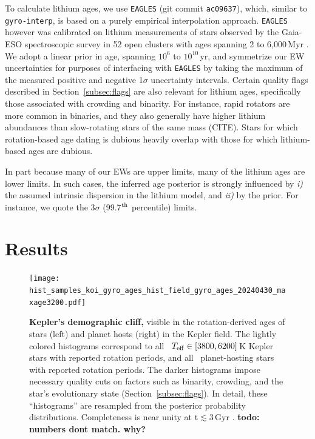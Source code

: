 \documentclass[11pt,twocolumn,tighten]{aastex63}
\begin{document}
To calculate lithium ages, we use \texttt{EAGLES} (git commit
\texttt{ac09637}), which, similar to
\texttt{gyro-interp}, is based on a purely empirical interpolation
approach.  \texttt{EAGLES} however was calibrated on lithium measurements of
stars observed by the
Gaia-ESO spectroscopic survey in 52 open clusters with ages spanning 2
to 6{,}000\,Myr \citep{Jeffries_2023}.  We adopt a linear prior in
age, spanning $10^6$ to $10^{10}$\,yr, and symmetrize our EW
uncertainties for purposes of interfacing with \texttt{EAGLES} by
taking the maximum of the measured positive and negative 1$\sigma$
uncertainty intervals.
Certain quality flags described in Section~\ref{subsec:flags} are also
relevant for lithium ages, specifically those associated with
crowding and binarity.
For instance, rapid rotators are more common in binaries, and they also
generally have higher lithium abundances than slow-rotating stars of the
same mass (CITE).
Stars for which rotation-based age dating is dubious heavily overlap
with those for which lithium-based ages are dubious.

In part because many of our EWs are upper limits, 
many of the lithium ages are lower limits.
In such cases,  the inferred age posterior is strongly influenced by
{\it i)} the assumed intrinsic dispersion in the lithium model,
and {\it ii)} by the prior.
For instance, 
 we quote the 3$\sigma$ (99.7$^{\rm th}$ percentile) limits.


\section{Results}
\label{sec:results}

\begin{figure}[!t]
  \begin{center}
    \leavevmode
    \texttt{[image: hist\_samples\_koi\_gyro\_ages\_hist\_field\_gyro\_ages\_20240430\_maxage3200.pdf]}
  \end{center}
  \vspace{-0.6cm}
  \caption{
    {\bf Kepler's demographic cliff,} visible in the rotation-derived
    ages of stars (left) and planet hosts (right) in the Kepler field.
    The lightly colored histograms correspond to all
    \nuniqstarsantosrotteffcut\ $T_{\rm eff}\in[3800,6200]\,$K Kepler
    stars with reported rotation periods, and all
    \nplhoststarwgyroage\ planet-hosting stars with reported rotation
    periods.
    The darker histograms impose necessary quality cuts on factors
    such as binarity, crowding, and the star's evolutionary state
    (Section~\ref{subsec:flags}).
    In detail, these ``histograms'' are resampled from the posterior
    probability distributions.
    Completeness is near unity at t$\lesssim$3\,Gyr
    \citep{2022ApJ...937...94M}.
    {\bf todo: numbers dont match.  why?}
    \label{fig:hist_tgyro}
  }
\end{figure}
\end{document}
